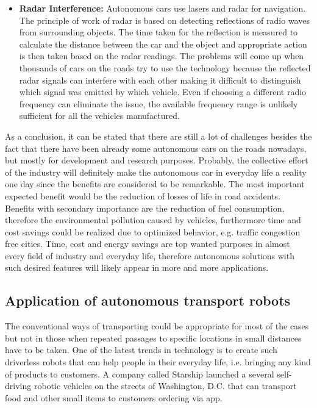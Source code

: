 \documentclass[12pt,english,twoside]{article}
\begin{document}
\begin{itemize}
	\item \textbf{Radar Interference:}
	Autonomous cars use lasers and radar for navigation. The principle of work of radar is based on detecting reflections of radio waves from surrounding objects. The time taken for the reflection is measured to calculate the distance between the car and the object and appropriate action is then taken based on the radar readings. The problems will come up when thousands of cars on the roads try to use the technology because the reflected radar signals can interfere with each other making it difficult to distinguish which signal was emitted by which vehicle. Even if choosing a different radio frequency can eliminate the issue, the available frequency range is unlikely sufficient for all the vehicles manufactured.
	\cite{5c}
\end{itemize}
As a conclusion, it can be stated that there are still a lot of challenges besides the fact that there have been already some autonomous cars on the roads nowadays, but mostly for development and research purposes. Probably, the collective effort of the industry will definitely make the autonomous car in everyday life a reality one day since the benefits are considered to be remarkable. The most important expected benefit would be the reduction of losses of life in road accidents. Benefits with secondary importance are the reduction of fuel consumption, therefore the environmental pollution caused by vehicles, furthermore time and cost savings could be realized due to optimized behavior, e.g. traffic congestion free cities. Time, cost and energy savings are top wanted purposes in almost every field of industry and everyday life, therefore autonomous solutions with such desired features will likely appear in more and more applications. 

\subsection{Application of autonomous transport robots}
The conventional ways of transporting could be appropriate for most of the cases but not in those when repeated passages to specific locations in small distances have to be taken.
One of the latest trends in technology is to create such driverless robots that can help people in their everyday life, i.e. bringing any kind of products to customers. A company called Starship launched a several self-driving robotic vehicles on the streets of Washington, D.C. that can transport food and other small items to customers ordering via app.
\end{document}

